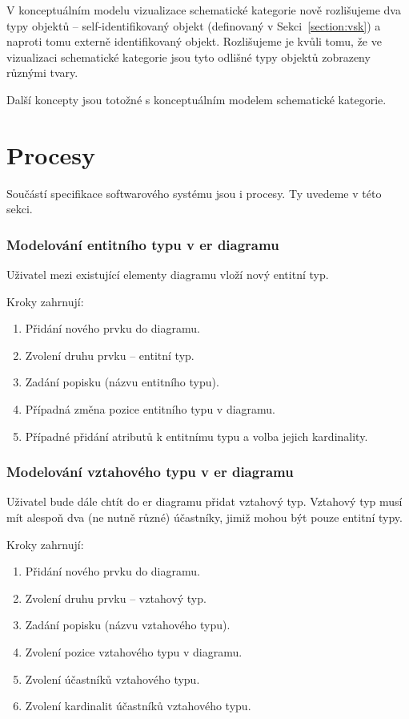V konceptuálním modelu vizualizace schematické kategorie nově rozlišujeme dva typy objektů -- self-identifikovaný objekt (definovaný v Sekci~\ref{section:vsk}) a naproti tomu externě identifikovaný objekt.
Rozlišujeme je kvůli tomu, že ve vizualizaci schematické kategorie jsou tyto odlišné typy objektů zobrazeny různými tvary.

Další koncepty jsou totožné s konceptuálním modelem schematické kategorie.

\section{Procesy}

Součástí specifikace softwarového systému jsou i procesy.
Ty uvedeme v této sekci.

\subsubsection*{Modelování entitního typu v \acrshort{er} diagramu}

Uživatel mezi existující elementy diagramu vloží nový entitní typ.

\noindent Kroky zahrnují:
\begin{enumerate}
  \item Přidání nového prvku do diagramu.
  \item Zvolení druhu prvku -- entitní typ.
  \item Zadání popisku (názvu entitního typu).
  \item Případná změna pozice entitního typu v diagramu.
  \item Případné přidání atributů k entitnímu typu a volba jejich kardinality.
\end{enumerate}

\subsubsection*{Modelování vztahového typu v \acrshort{er} diagramu}
Uživatel bude dále chtít do \acrshort{er} diagramu přidat vztahový typ.
Vztahový typ musí mít alespoň dva (ne nutně různé) účastníky, jimiž mohou být pouze entitní typy.

\noindent Kroky zahrnují:
\begin{enumerate}
  \item Přidání nového prvku do diagramu.
  \item Zvolení druhu prvku -- vztahový typ.
  \item Zadání popisku (názvu vztahového typu).
  \item Zvolení pozice vztahového typu v diagramu.
  \item Zvolení účastníků vztahového typu.
  \item Zvolení kardinalit účastníků vztahového typu.
\end{enumerate}

